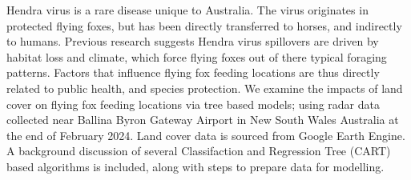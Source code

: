 \begin{doublespace}
Hendra virus is a rare disease unique to Australia. The virus originates in protected flying
foxes, but has been directly transferred to horses, and indirectly to humans. Previous
research suggests Hendra virus spillovers are driven by habitat loss and climate, which
force flying foxes out of there typical foraging patterns. Factors that influence flying
fox feeding locations are thus directly related to public health, and species protection.
We examine the impacts of land cover on flying fox feeding locations via tree based models;
using radar data collected near Ballina Byron Gateway Airport in New South Wales Australia
at the end of February 2024. Land cover data is sourced from Google Earth Engine. A
background discussion of several Classifaction and Regression Tree (CART) based algorithms
is included, along with steps to prepare data for modelling.
\end{doublespace}
